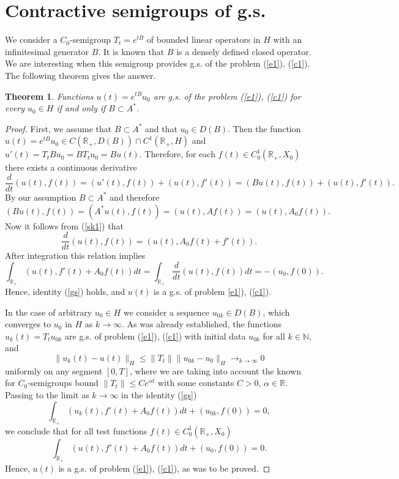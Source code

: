 \documentclass[12pt]{article}
\newcommand{\R}{{\mathbb R}}
\newcommand{\N}{{\mathbb N}}
\numberwithin{equation}{section}
\theoremstyle{plain}
\newtheorem{theorem}{Theorem}[section]
\theoremstyle{definition}
\begin{document}
\section{Contractive semigroups of g.s.}
We consider a $C_0$-semigroup $T_t=e^{tB}$ of bounded linear operators in $H$ with an infinitesimal generator $B$. It is known that $B$ is a densely defined closed operator.
We are interesting when this semigroup provides g.s. of the problem  (\ref{e1}), (\ref{c1}). The following theorem gives the answer.

\begin{theorem}\label{th1}
Functions $u(t)=e^{tB}u_0$ are g.s. of the problem (\ref{e1}), (\ref{c1}) for every $u_0\in H$ if and only if $B\subset A^*$.
\end{theorem}

\begin{proof}
First, we assume that $B\subset A^*$ and that $u_0\in D(B)$. Then the function $u(t)=e^{tB}u_0\in C(\R_+,D(B))\cap C^1(\R_+,H)$ and $u'(t)=T_tBu_0=BT_tu_0=Bu(t)$. Therefore, for each $f(t)\in C_0^1(\R_+,X_0)$ there exists a continuous derivative
\begin{equation}\label{sk1}
\frac{d}{dt}(u(t),f(t))=(u'(t),f(t))+(u(t),f'(t))=(Bu(t),f(t))+(u(t),f'(t)).
\end{equation}
By our assumption $B\subset A^*$ and therefore
\[
(Bu(t),f(t))=(A^*u(t),f(t))=(u(t),Af(t))=(u(t),A_0f(t)).
\]
Now it follows from (\ref{sk1}) that
\[
\frac{d}{dt}(u(t),f(t))=(u(t),A_0f(t)+f'(t)).
\]
After integration this relation implies
\[
\int_{\R_+}(u(t),f'(t)+A_0f(t))dt=\int_{\R_+}\frac{d}{dt}(u(t),f(t))dt=-(u_0,f(0)).
\]
Hence, identity (\ref{gs}) holds, and $u(t)$ is a g.s. of problem \ref{e1}), (\ref{c1}).

In the case of arbitrary $u_0\in H$ we consider a sequence
$u_{0k}\in D(B)$, which converges to $u_0$ in $H$ as $k\to\infty$. As was already established, the functions $u_k(t)=T_tu_{0k}$ are g.s. of problem (\ref{e1}), (\ref{c1}) with initial data $u_{0k}$ for all $k\in\N$, and
\[
\|u_k(t)-u(t)\|_H\le\|T_t\|\|u_{0k}-u_0\|_H\mathop{\to}_{k\to\infty} 0
\]
uniformly on any segment $[0,T]$, where we are taking into account the known for $C_0$-semigroups bound $\|T_t\|\le Ce^{\alpha t}$ with some constants $C>0$, $\alpha\in\R$.
Passing to the limit as $k\to\infty$ in the identity (\ref{gs})
\[
\int_{\R_+}(u_k(t),f'(t)+A_0f(t))dt+(u_{0k},f(0))=0,
\]
we conclude that for all test functions $f(t)\in C_0^1(\R_+,X_0)$
\[
\int_{\R_+}(u(t),f'(t)+A_0f(t))dt+(u_0,f(0))=0.
\]
Hence, $u(t)$ is a g.s. of problem (\ref{e1}), (\ref{c1}), as was to be proved.


\end{proof}
\end{document}
